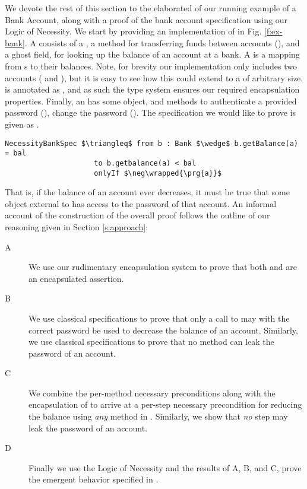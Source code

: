 We devote the rest of this section to the elaborated of our
running example of a Bank Account, along with a proof 
of the bank account specification using our Logic of Necessity.
We start by providing an implementation of  in Fig. \ref{f:ex-bank}.
A  consists of a , a method for transferring 
funds between accounts (), and a ghost field, 
for looking up the balance of an account at a bank. 
A  is
a mapping from s to their balances. Note, for brevity
our implementation only includes two accounts ( and ),
but it is easy to see how this could extend to a 
of arbitrary size.  is annotated as \enclosed, and as 
such the type system ensures our required encapsulation properties.
Finally, an  has some  object, and 
methods to authenticate a provided password (), 
change the password ().
The specification we would like to prove is given as .
\begin{lstlisting}[language = Chainmail, mathescape=true, frame=lines]
NecessityBankSpec $\triangleq$ from b : Bank $\wedge$ b.getBalance(a) = bal 
                     to b.getbalance(a) < bal
                     onlyIf $\neg\wrapped{\prg{a}}$
\end{lstlisting}
That is, if the balance of an account ever decreases, it must be true that some object external to
 has access to the password of that account. An informal account of the construction of 
the overall proof follows the outline of our reasoning given in Section \ref{s:approach}:
\begin{description}
\item[A]
We use our rudimentary encapsulation system to prove that both  and  are an encapsulated assertion.
\item[B]
We use classical specifications to prove that only a call to  may 
with the correct password be used to decrease the balance of an account. Similarly, we
use classical specifications to prove that no method can leak the password of an account.
\item[C]
We combine the per-method necessary preconditions along with the encapsulation of  to arrive at a per-step
necessary precondition for reducing the balance using \emph{any} method in . Similarly, 
we show that \emph{no} step may leak the password of an account.
\item[D]
Finally we use the Logic of Necessity and the results of A, B, and C, prove the emergent behavior specified in .
\end{description}

